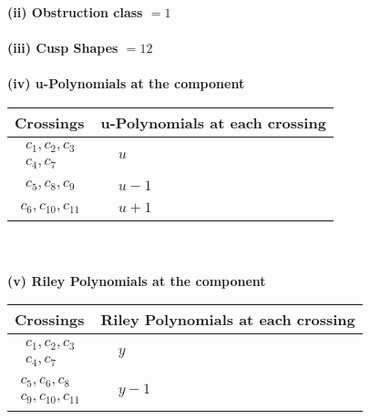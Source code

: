 \documentclass[1p]{elsarticle_modified}
\theoremstyle{definition}
\begin{document}
\flushleft \textbf{(ii) Obstruction class $= 1$}\\~\\
\flushleft \textbf{(iii) Cusp Shapes $= 12$}\\~\\
\newpage\renewcommand{\arraystretch}{1}
\flushleft \textbf{(iv) u-Polynomials at the component}\newline \\
\begin{tabular}{m{50pt}|m{274pt}}
Crossings & \hspace{64pt}u-Polynomials at each crossing \\
\hline $$\begin{aligned}c_{1},c_{2},c_{3}\\c_{4},c_{7}\end{aligned}$$&$\begin{aligned}
&u
\end{aligned}$\\
\hline $$\begin{aligned}c_{5},c_{8},c_{9}\end{aligned}$$&$\begin{aligned}
&u-1
\end{aligned}$\\
\hline $$\begin{aligned}c_{6},c_{10},c_{11}\end{aligned}$$&$\begin{aligned}
&u+1
\end{aligned}$\\
\hline
\end{tabular}\\~\\
\newpage\renewcommand{\arraystretch}{1}
\flushleft \textbf{(v) Riley Polynomials at the component}\newline \\
\begin{tabular}{m{50pt}|m{274pt}}
Crossings & \hspace{64pt}Riley Polynomials at each crossing \\
\hline $$\begin{aligned}c_{1},c_{2},c_{3}\\c_{4},c_{7}\end{aligned}$$&$\begin{aligned}
&y
\end{aligned}$\\
\hline $$\begin{aligned}c_{5},c_{6},c_{8}\\c_{9},c_{10},c_{11}\end{aligned}$$&$\begin{aligned}
&y-1
\end{aligned}$\\
\hline
\end{tabular}\\~\\
\end{document}

